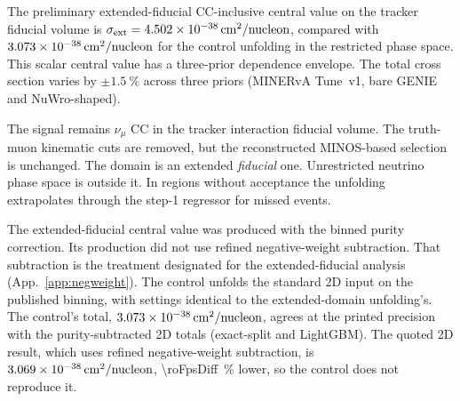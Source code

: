 \label{sec:fps}

The preliminary extended-fiducial CC-inclusive central value on the tracker fiducial volume is $\sigma_{\mathrm{ext}} = \SI{4.502e-38}{cm^2/nucleon}$, compared with $\SI{3.073e-38}{cm^2/nucleon}$ for the control unfolding in the restricted phase space. This scalar central value has a three-prior dependence envelope. The total cross section varies by $\pm\SI{1.5}{\percent}$ across three priors (MINERvA Tune~v1, bare GENIE and NuWro-shaped).

The signal remains $\nu_\mu$ CC in the tracker interaction fiducial volume. The truth-muon kinematic cuts are removed, but the reconstructed MINOS-based selection is unchanged. The domain is an extended \emph{fiducial} one. Unrestricted neutrino phase space is outside it. In regions without acceptance the unfolding extrapolates through the step-1 regressor for missed events.

The extended-fiducial central value was produced with the binned purity correction. Its production did not use refined negative-weight subtraction. That subtraction is the treatment designated for the extended-fiducial analysis (App.~\ref{app:negweight}). The control unfolds the standard 2D input on the published binning, with settings identical to the extended-domain unfolding's. The control's total, $\SI{3.073e-38}{cm^2/nucleon}$, agrees at the printed precision with the purity-subtracted 2D totals (exact-split and LightGBM). The quoted 2D result, which uses refined negative-weight subtraction, is $\SI{3.069e-38}{cm^2/nucleon}$, \SI{\roFpsDiff}{\percent} lower, so the control does not reproduce it.

